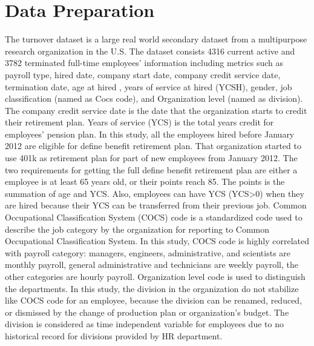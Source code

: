 \documentclass[12pt,letterpaper]{article}
\begin{document}
\section{Data Preparation}\label{data.desc}
The turnover dataset is a large real world secondary dataset from a multipurpose research organization in the U.S. The dataset consists 4316 current active and 3782 terminated full-time employees' information including metrics such as payroll type, hired date, company start date, company credit service date, termination date, age at hired , years of service at hired (YCSH), gender, job classification (named as Cocs code), and Organization level (named as division). The company credit service date is the date that the organization starts to credit their retirement plan. Years of service (YCS) is the total years credit for employees' pension plan. In this study, all the employees hired before January 2012 are eligible for define benefit retirement plan. That organization started to use 401k as retirement plan for part of new employees from January 2012. The two requirements for getting the full define benefit retirement plan are either a employee is at least 65 years old, or their points reach 85. The points is the summation of age and YCS. Also, employees can have YCS (YCS>0) when they are hired because their YCS can be transferred from their previous job. %
Common Occupational Classification System (COCS) code is a standardized code used to describe the job category by the organization for reporting to Common Occupational Classification System. In this study, COCS code is highly correlated with payroll category: managers, engineers, administrative, and scientists are monthly payroll, general administrative and technicians are weekly payroll, the other categories are hourly payroll.
Organization level code is used to distinguish the departments. In this study, the division in the organization do not stabilize like COCS code for an employee, because the division can be renamed, reduced, or dismissed by the change of production plan or organization's budget. The division is considered as time independent variable for employees due to no historical record for divisions provided by HR department.
\end{document}
